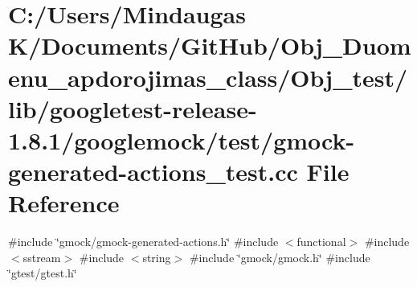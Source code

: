 \hypertarget{_obj__test_2lib_2googletest-release-1_88_81_2googlemock_2test_2gmock-generated-actions__test_8cc}{}\section{C\+:/\+Users/\+Mindaugas K/\+Documents/\+Git\+Hub/\+Obj\+\_\+\+Duomenu\+\_\+apdorojimas\+\_\+class/\+Obj\+\_\+test/lib/googletest-\/release-\/1.8.1/googlemock/test/gmock-\/generated-\/actions\+\_\+test.cc File Reference}
\label{_obj__test_2lib_2googletest-release-1_88_81_2googlemock_2test_2gmock-generated-actions__test_8cc}
{\ttfamily \#include \char`\"{}gmock/gmock-\/generated-\/actions.\+h\char`\"{}}\newline
{\ttfamily \#include $<$functional$>$}\newline
{\ttfamily \#include $<$sstream$>$}\newline
{\ttfamily \#include $<$string$>$}\newline
{\ttfamily \#include \char`\"{}gmock/gmock.\+h\char`\"{}}\newline
{\ttfamily \#include \char`\"{}gtest/gtest.\+h\char`\"{}}\newline
